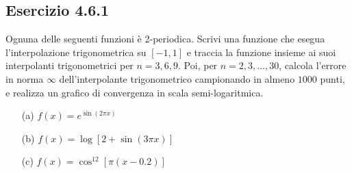 \documentclass[letterpaper, 12pt]{article}
\numberwithin{equation}{section}    %
\begin{document}
\subsection{Esercizio 4.6.1} 
Ognuna delle seguenti funzioni è 2-periodica. Scrivi una funzione che esegua l'interpolazione trigonometrica 
su $[-1,1]$ e traccia la funzione insieme ai suoi interpolanti trigonometrici per $n=3,6,9$. 
Poi, per $n=2,3,\ldots,30$, calcola l'errore in norma $\infty$ dell'interpolante trigonometrico campionando 
in almeno $1000$ punti, e realizza un grafico di convergenza in scala semi-logaritmica. 
\begin{itemize}
    \item[(a)] $f(x) = e^{\sin (2\pi x)}$
    \item[(b)] $f(x) = \log [2+ \sin (3 \pi x ) ]$
    \item[(c)] $f(x) = \cos^{12}[\pi (x-0.2)]$
\end{itemize}
\end{document}
